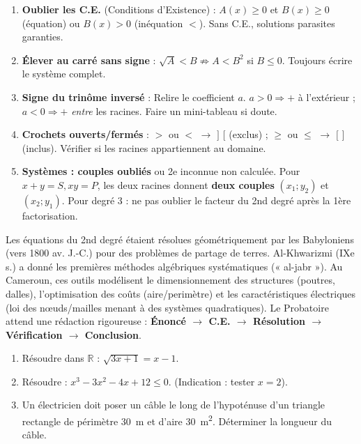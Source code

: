 \documentclass[11pt]{article}
\begin{document}
\begin{attention}
\begin{enumerate}
\item \textbf{Oublier les C.E.} (Conditions d'Existence) : $A(x)\geq 0$ et $B(x)\geq 0$ (équation) ou $B(x)>0$ (inéquation $<$). Sans C.E., solutions parasites garanties.
\item \textbf{Élever au carré sans signe} : $\sqrt{A}<B \not\Rightarrow A<B^2$ si $B\leq 0$. Toujours écrire le système complet.
\item \textbf{Signe du trinôme inversé} : Relire le coefficient $a$. $a>0 \Rightarrow +$ à l'extérieur ; $a<0 \Rightarrow +$ \emph{entre} les racines. Faire un mini-tableau si doute.
\item \textbf{Crochets ouverts/fermés} : $>$ ou $<$ $\to$ $]$ $[$ (exclus) ; $\geq$ ou $\leq$ $\to$ $[$ $]$ (inclus). Vérifier si les racines appartiennent au domaine.
\item \textbf{Systèmes : couples oubliés} ou 2e inconnue non calculée. Pour $x+y=S, xy=P$, les deux racines donnent \textbf{deux couples} $(x_1;y_2)$ et $(x_2;y_1)$. Pour degré 3 : ne pas oublier le facteur du 2nd degré après la 1ère factorisation.
\end{enumerate}
\end{attention}

\begin{savaistu}
Les équations du 2nd degré étaient résolues géométriquement par les Babyloniens (vers 1800 av. J.-C.) pour des problèmes de partage de terres. Al-Khwarizmi (IXe s.) a donné les premières méthodes algébriques systématiques (« al-jabr »). Au Cameroun, ces outils modélisent le dimensionnement des structures (poutres, dalles), l'optimisation des coûts (aire/perimètre) et les caractéristiques électriques (loi des nœuds/mailles menant à des systèmes quadratiques). Le Probatoire attend une rédaction rigoureuse : \textbf{Énoncé $\to$ C.E. $\to$ Résolution $\to$ Vérification $\to$ Conclusion}.
\end{savaistu}

\begin{exercice}
\begin{enumerate}
\item Résoudre dans $\mathbb{R}$ : $\sqrt{3x+1}=x-1$.
\item Résoudre : $x^3-3x^2-4x+12\leq 0$. (Indication : tester $x=2$).
\item Un électricien doit poser un câble le long de l'hypoténuse d'un triangle rectangle de périmètre \SI{30}{m} et d'aire \SI{30}{m^2}. Déterminer la longueur du câble.
\end{enumerate}
\end{exercice}
\end{document}
